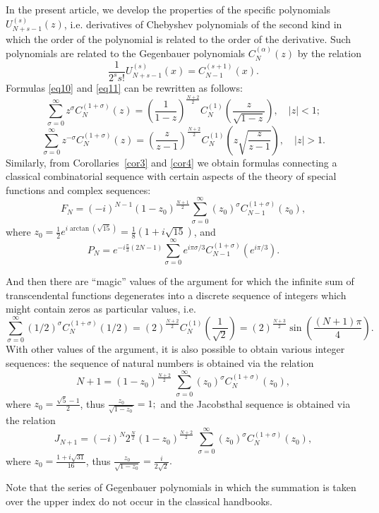 \documentclass{article}
\begin{document}
In the present article, we develop the properties of the specific polynomials $U_{N + s - 1}^{(s)}(z)$, i.e. derivatives of Chebyshev polynomials of the second kind in which the order of the polynomial is related to the order of the derivative. Such polynomials are related to the Gegenbauer polynomials $C_N^{(\alpha)}(z)$ \cite{ref12} by the relation
$$
\frac{1}{2^s s!}U_{N + s - 1}^{(s)}(x) = C_{N - 1}^{(s + 1)}(x).
$$
Formulas \eqref{eq10} and \eqref{eq11} can be rewritten as follows:
$$
\sum_{\sigma = 0}^{\infty}z^\sigma C_{N}^{(1 + \sigma)}(z) = \left(\frac{1}{1-z}\right)^{\frac{N + 2}{2}}C_{N}^{(1)}\left(\frac{z}{\sqrt{1 - z}}\right), \quad |z| < 1;
$$
$$
\sum_{\sigma = 0}^{\infty}z^{-\sigma} C_{N}^{(1 + \sigma)}(z) = \left(\frac{z}{z - 1}\right)^{\frac{N + 2}{2}}C_{N}^{(1)}\left(z\sqrt{\frac{z}{z - 1}}\right), \quad |z| > 1.
$$
Similarly, from Corollaries~\ref{cor3} and \ref{cor4} we obtain formulas connecting a classical combinatorial sequence with certain aspects of the theory of special functions and complex sequences:
$$
F_N = (-i)^{N - 1}(1 - z_0)^{\frac{N + 1}{2}} \sum_{\sigma = 0}^{\infty} (z_0)^\sigma C_{N - 1}^{(1 + \sigma)}(z_0),
$$
where $z_0 = \frac{1}{2}e^{i\arctan(\sqrt{15})} = \frac{1}{8}(1 + i\sqrt{15})$, and
$$
P_N=e^{-i\frac\pi3(2N-1)}\sum_{\sigma=0}^\infty e^{i\pi\sigma/3} C_{N-1}^{(1+\sigma)}(e^{i\pi/3}).
$$

And then there are ``magic'' values of the argument for which the infinite sum of transcendental functions degenerates into a discrete sequence of integers which might contain zeros as particular values, i.e.
$$
\sum_{\sigma = 0}^{\infty}(1/2)^\sigma C_{N}^{(1 + \sigma)}(1/2) = (2)^{\frac{N + 2}{2}} C_N^{(1)}\left(\frac{1}{\sqrt{2}}\right) = (2)^{\frac{N + 3}{2}}\sin\left(\frac{(N + 1)\pi}{4}\right).
$$
With other values of the argument, it is also possible to obtain various integer sequences:  
the sequence of natural numbers is obtained via the relation
$$
N+1=(1-z_0)^{\frac{N+2}2}\;\sum_{\sigma=0}^\infty (z_0)^\sigma C_N^{(1+\sigma)}(z_0),
$$
where $\displaystyle z_0=\frac{\sqrt 5-1}2$, thus $\displaystyle\frac{z_0}{\sqrt{1-z_0}}=1;$
and the Jacobsthal sequence is obtained via the relation
$$
J_{N+1}=(-i)^N2^{\frac N2}(1-z_0)^{\frac{N+2}2}\; \sum_{\sigma=0}^\infty (z_0)^\sigma C_N^{(1+\sigma)}(z_0),
$$
where $\displaystyle z_0=\frac{1+i\sqrt{31}}{16}$, thus $\displaystyle\frac{z_0}{\sqrt{1-z_0}}=\frac i{2\sqrt 2}.$

Note that the series of Gegenbauer polynomials in which the summation is taken over the upper index do not occur in the classical handbooks.
\end{document}
